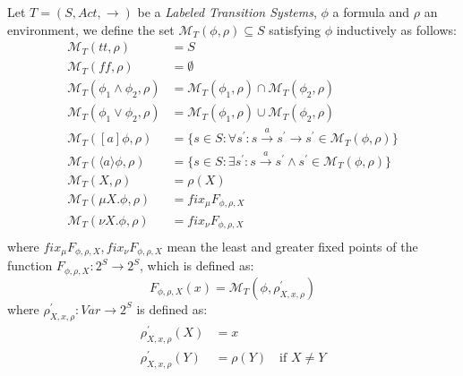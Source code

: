 Let $T = (S, Act, \rightarrow)$ be a \emph{Labeled Transition
  Systems}, $\phi$ a formula and $\rho$ an environment, we define the
set $\mathcal{M}_T(\phi, \rho) \subseteq S$ satisfying $\phi$
inductively as follows:
\begin{displaymath}
  \begin{split}
    \mathcal{M}_T(tt, \rho) &= S \\
    \mathcal{M}_T(ff, \rho) &= \emptyset \\
    \mathcal{M}_T(\phi_1 \wedge \phi_2, \rho) &=
    \mathcal{M}_T(\phi_1, \rho) \cap     \mathcal{M}_T(\phi_2, \rho)\\
    \mathcal{M}_T(\phi_1 \vee \phi_2, \rho) &=
    \mathcal{M}_T(\phi_1, \rho) \cup     \mathcal{M}_T(\phi_2, \rho)\\
    \mathcal{M}_T([a]\phi, \rho) &= \{ s\in S: \forall s^{\prime}: s
    \xrightarrow{a} s^{\prime} \rightarrow s^{\prime} \in
    \mathcal{M}_T(\phi, \rho)\} \\
    \mathcal{M}_T(\langle a \rangle \phi, \rho) &= \{ s\in S: \exists
    s^{\prime}: s \xrightarrow{a} s^{\prime} \wedge s^{\prime} \in
    \mathcal{M}_T(\phi, \rho)\} \\
    \mathcal{M}_T(X, \rho) &= \rho(X) \\
    \mathcal{M}_T(\mu X.\phi, \rho) &= fix_{\mu}F_{\phi, \rho, X} \\
    \mathcal{M}_T(\nu X.\phi, \rho) &= fix_{\nu}F_{\phi, \rho, X} \\
  \end{split}
\end{displaymath}
where $fix_{\mu}F_{\phi, \rho, X}, fix_{\nu}F_{\phi, \rho, X}$ mean
the least and greater fixed points of the function $F_{\phi, \rho, X}:
2^S \rightarrow 2^S$, which is defined as:
\begin{displaymath}
  F_{\phi, \rho, X}(x) = \mathcal{M}_T(\phi, \rho_{X, x, \rho}^{\prime})
\end{displaymath}
where $\rho_{X, x, \rho}^{\prime}: Var \rightarrow 2^S$ is defined as:
\begin{displaymath}
  \begin{split}
    \rho_{X, x, \rho}^{\prime}(X) &= x \\
    \rho_{X, x, \rho}^{\prime}(Y) &= \rho(Y) \quad \text{if } X\not=Y\\
  \end{split}
\end{displaymath}

